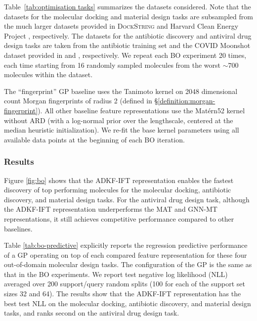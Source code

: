         Table~\ref{tab:optimisation tasks} summarizes the datasets considered.
        Note that the datasets for the molecular
        docking and material design tasks are subsampled from the much larger datasets provided
        in \textsc{DockString} \citep{ortegon2021dockstring} and Harvard Clean Energy Project
        \citep{hachmann2011harvard}, respectively. The datasets for the antibiotic discovery
        and antiviral drug design tasks are taken from the antibiotic training set and the
        COVID Moonshot dataset provided in \citet{STOKES2020} and \citet{covidmoonshot},
        respectively. We repeat each BO experiment 20 times, each time starting from 16
        randomly sampled molecules from the worst $\sim 700$ molecules within the dataset. 
        
        The ``fingerprint'' GP baseline
        uses the Tanimoto kernel on
        2048 dimensional count Morgan fingerprints of radius 2 (defined in \S\ref{definition:morgan-fingerprint}).
        All other baseline feature representations use the Mat\'ern52 kernel
        without ARD (with a log-normal prior over the lengthscale, centered at the
        median heuristic initialization).
        We re-fit the base kernel parameters using all available data points at the beginning
        of each BO iteration.

        \subsubsection{Results}

        Figure \ref{fig:bo} shows that the ADKF-IFT representation enables the fastest discovery of
        top performing molecules for the molecular docking, antibiotic discovery, and material design tasks. For the antiviral
        drug design task, although the ADKF-IFT representation underperforms the MAT and GNN-MT representations, it still achieves
        competitive performance compared to other baselines.
        
        Table \ref{tab:bo-predictive} explicitly reports the regression predictive performance of a GP operating on top of
        each compared feature representation for these four out-of-domain molecular design tasks. The configuration of the GP
        is the same as that in the BO experiments. We report test negative log likelihood (NLL) averaged over 200 support/query
        random splits (100 for each of the support set sizes 32 and 64). The results show that the ADKF-IFT representation has
        the best test NLL on the molecular docking, antibiotic discovery, and material design tasks, and ranks second on
        the antiviral drug design task.
        
